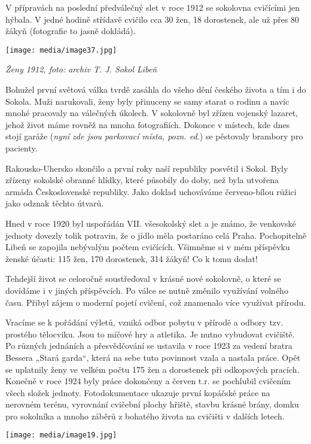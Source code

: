 V přípravách na poslední předválečný slet v roce 1912 se sokolovna
cvičícími jen hýbala. V jedné hodině střídavě cvičilo cca 30 žen, 18
dorostenek, ale už přes 80 žákyň (fotografie to jasně dokládá).

\texttt{[image: media/image37.jpg]}

\emph{Ženy 1912, foto: archiv T. J. Sokol Libeň}

Bohužel první světová válka tvrdě zasáhla do všeho dění českého života a
tím i do Sokola. Muži narukovali, ženy byly přinuceny se samy starat o
rodinu a navíc mnohé pracovaly na válečných úkolech. V sokolovně byl
zřízen vojenský lazaret, jehož život máme rovněž na mnoha fotografiích.
Dokonce v místech, kde dnes stojí garáže (\emph{nyní zde jsou parkovací
místa, pozn. ed.}) se pěstovaly brambory pro pacienty.

Rakousko-Uhersko skončilo a první roky naší republiky posvětil i Sokol.
Byly zřízeny sokolské obranné hlídky, které působily do doby, než byla
utvořena armáda Československé republiky. Jako doklad uchováváme
červeno-bílou růžici jako odznak těchto útvarů.

Hned v roce 1920 byl uspořádán VII. všesokolský slet a je známo, že
venkovské jednoty dovezly tolik potravin, že o jídlo měla postaráno celá
Praha. Pochopitelně Libeň se zapojila nebývalým počtem cvičících.
Všimněme si v mém příspěvku ženské účasti: 115 žen, 170 dorostenek, 314
žákyň! Co k tomu dodat!

Tehdejší život se celoročně soustřeďoval v krásné nové sokolovně, o
které se dovídáme i v jiných příspěvcích. Po válce se nutně změnilo
využívání volného času. Přibyl zájem o moderní pojetí cvičení, což
znamenalo více využívat přírodu.

Vracíme se k pořádání výletů, vzniká odbor pobytu v přírodě a odbory
tzv. prostého tělocviku. Jsou to míčové hry a atletika. Je nutno
vybudovat cvičiště. Po různých jednáních a přesvědčování se ustavila v
roce 1923 za vedení bratra Bessera „Stará garda``, která na sebe tuto
povinnost vzala a nastala práce. Opět se uplatnily ženy ve velkém počtu
175 žen a dorostenek při odkopových pracích. Konečně v roce 1924 byly
práce dokončeny a červen t.r. se pochlubil cvičením všech složek
jednoty. Fotodokumentace ukazuje první kopáčské práce na nerovném
terénu, vyrovnání cvičební plochy hřiště, stavbu krásné brány, domku pro
sokolníka a mnoho záběrů z bohatého života na cvičišti v dalších letech.

\texttt{[image: media/image19.jpg]}


